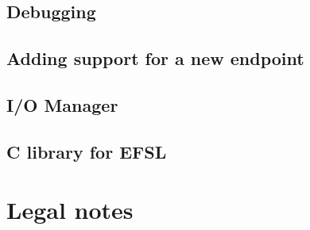 \documentclass[a4paper,fleqn]{article}
\begin{document}
\subsection{Debugging}
	
\subsection{Adding support for a new endpoint}
	
\subsection{I/O Manager}
	
\subsection{C library for EFSL}
	
	
\newpage
\section{Legal notes}
	

%
%
\end{document}
